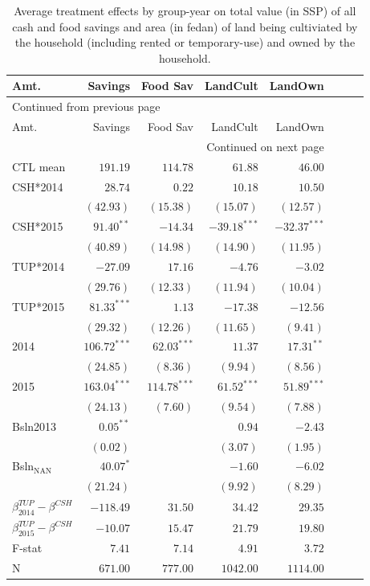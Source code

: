 \documentclass[12pt,article]{article}
\begin{document}
\begin{longtable}{lrrrrrrr}
\caption{\label{tab:orgtable6}
Average treatment effects by group-year on total value (in SSP) of all cash and food savings and area (in fedan) of land being cultiviated by the household (including rented or temporary-use) and owned by the household.}
\\
\hline
Amt. & Savings & Food Sav & LandCult & LandOwn\\
\hline
\endfirsthead
\multicolumn{5}{l}{Continued from previous page} \\
\hline

Amt. & Savings & Food Sav & LandCult & LandOwn \\

\hline
\endhead
\hline\multicolumn{5}{r}{Continued on next page} \\
\endfoot
\endlastfoot
\hline
CTL mean & \(191.19\) & \(114.78\) & \(61.88\) & \(46.00\)\\
\hline
CSH*2014 & \(28.74\) & \(0.22\) & \(10.18\) & \(10.50\)\\
 & \((42.93)\) & \((15.38)\) & \((15.07)\) & \((12.57)\)\\
CSH*2015 & \(91.40^{**}\) & \(-14.34\) & \(-39.18^{***}\) & \(-32.37^{***}\)\\
 & \((40.89)\) & \((14.98)\) & \((14.90)\) & \((11.95)\)\\
TUP*2014 & \(-27.09\) & \(17.16\) & \(-4.76\) & \(-3.02\)\\
 & \((29.76)\) & \((12.33)\) & \((11.94)\) & \((10.04)\)\\
TUP*2015 & \(81.33^{***}\) & \(1.13\) & \(-17.38\) & \(-12.56\)\\
 & \((29.32)\) & \((12.26)\) & \((11.65)\) & \(( 9.41)\)\\
2014 & \(106.72^{***}\) & \(62.03^{***}\) & \(11.37\) & \(17.31^{**}\)\\
 & \((24.85)\) & \(( 8.36)\) & \(( 9.94)\) & \(( 8.56)\)\\
2015 & \(163.04^{***}\) & \(114.78^{***}\) & \(61.52^{***}\) & \(51.89^{***}\)\\
 & \((24.13)\) & \(( 7.60)\) & \(( 9.54)\) & \(( 7.88)\)\\
Bsln2013 & \(0.05^{**}\) &  & \(0.94\) & \(-2.43\)\\
 & \(( 0.02)\) &  & \(( 3.07)\) & \(( 1.95)\)\\
Bsln\(_{\text{NAN}}\) & \(40.07^{*}\) &  & \(-1.60\) & \(-6.02\)\\
 & \((21.24)\) &  & \(( 9.92)\) & \(( 8.29)\)\\
\hline
\(\beta^{TUP}_{2014}-\beta^{CSH}\) & \(-118.49\) & \(31.50\) & \(34.42\) & \(29.35\)\\
\(\beta^{TUP}_{2015}-\beta^{CSH}\) & \(-10.07\) & \(15.47\) & \(21.79\) & \(19.80\)\\
\hline
F-stat & \(7.41\) & \(7.14\) & \(4.91\) & \(3.72\)\\
N & \(671.00\) & \(777.00\) & \(1042.00\) & \(1114.00\)\\
\hline
\end{longtable}
\end{document}
